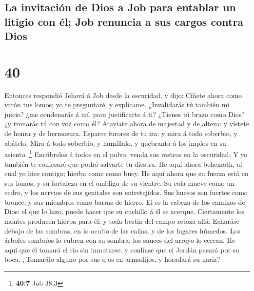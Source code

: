 \hypertarget{la-invitaciuxf3n-de-dios-a-job-para-entablar-un-litigio-con-uxe9l-job-renuncia-a-sus-cargos-contra-dios}{%
\subsection{La invitación de Dios a Job para entablar un litigio con él;
Job renuncia a sus cargos contra
Dios}\label{la-invitaciuxf3n-de-dios-a-job-para-entablar-un-litigio-con-uxe9l-job-renuncia-a-sus-cargos-contra-dios}}

\hypertarget{section-39}{%
\section{40}\label{section-39}}

 Entonces respondió Jehová á Job desde la oscuridad, y
dijo:  Cíñete ahora como varón tus lomos; yo te
preguntaré, y explícame.  ¿Invalidarás tú también mi
juicio? ¿me condenarás á mí, para justificarte á ti? 
¿Tienes tú brazo como Dios? ¿y tronarás tú con voz como él?
 Atavíate ahora de majestad y de alteza: y vístete de
honra y de hermosura.  Esparce furores de tu ira: y mira á
todo soberbio, y abátelo.  Mira á todo soberbio, y
humíllalo, y quebranta á los impíos en su asiento. \footnote{\textbf{40:7}
  Job 38,3}  Encúbrelos á todos en el polvo, venda sus
rostros en la oscuridad;  Y yo también te confesaré que
podrá salvarte tu diestra.  He aquí ahora behemoth, al
cual yo hice contigo; hierba come como buey.  He aquí
ahora que su fuerza está en sus lomos, y su fortaleza en el ombligo de
su vientre.  Su cola mueve como un cedro, y los nervios
de sus genitales son entretejidos.  Sus huesos son
fuertes como bronce, y sus miembros como barras de hierro.
 El es la cabeza de los caminos de Dios: el que lo hizo,
puede hacer que su cuchillo á él se acerque.  Ciertamente
los montes producen hierba para él: y toda bestia del campo retoza allá.
 Echaráse debajo de las sombras, en lo oculto de las
cañas, y de los lugares húmedos.  Los árboles sombríos lo
cubren con su sombra; los sauces del arroyo lo cercan. 
He aquí que él tomará el río sin inmutarse: y confíase que el Jordán
pasará por su boca.  ¿Tomarálo alguno por sus ojos en
armadijos, y horadará su nariz?  
  

